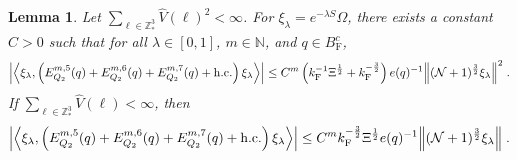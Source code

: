 \documentclass[12pt,a4paper]{article}
\numberwithin{equation}{section}
\newcommand{\NNN}{\mathbb{N}}
\newcommand{\1}{\mathbb{I}}
\newcommand{\F}{\mathrm{F}}
\newcommand{\Z}{\mathbb{Z}}
\newcommand{\NN}{\mathcal{N}}
\newcommand{\half}{\frac{1}{2}}
\newcommand{\eva}[1]{\left\langle #1 \right\rangle}
\theoremstyle{plain}
\newtheorem{lemma}[theorem]{Lemma}
\theoremstyle{definition}
\theoremstyle{remark}
\theoremstyle{plain}
\theoremstyle{definition}
\theoremstyle{remark}
\begin{document}
\begin{lemma} \label{lem:EQ213}
Let $ \sum_{\ell \in \Z^3_*} \hat{V}(\ell)^2 < \infty $. For $\xi_\lambda = e^{-\lambda S} \Omega$, there exists a constant $ C > 0 $ such that for all $ \lambda \in [0,1] $, $ m \in \NNN $, and $ q \in B_{\F}^c $,
\begin{equation}
\begin{aligned}
	\abs{\eva{\xi_\lambda,\left(E^{m,5}_{Q_2}(q) + E^{m,6}_{Q_2}(q) + E^{m,7}_{Q_2}(q) + \mathrm{h.c.}\right) \xi_\lambda }}
	\leq C^m \left( k_{\F}^{-1} \Xi^{\half}
		+ k_{\F}^{-\frac 32} \right)
		e(q)^{-1}
		\norm { (\NN+1)^{\frac 32} \xi_\lambda }^2 \;. \label{eq:estEQ213_Coulomb}
\end{aligned}
\end{equation}
If $ \sum_{\ell \in \Z^3_*} \hat{V}(\ell) < \infty $, then
\begin{equation}
\begin{aligned}
	\abs{\eva{\xi_\lambda,\left(E^{m,5}_{Q_2}(q) + E^{m,6}_{Q_2} (q) + E^{m,7}_{Q_2}(q) + \mathrm{h.c.}\right) \xi_\lambda }}
	\leq C^m k_{\F}^{-\frac 32} \Xi^{\half} e(q)^{-1}
		\norm { (\NN+1)^{\frac 32} \xi_\lambda } \;. \label{eq:estEQ213}
\end{aligned}
\end{equation}
\end{lemma}
\end{document}
